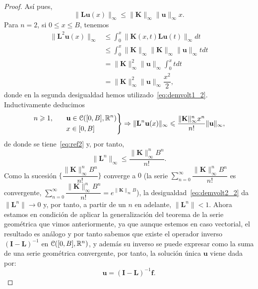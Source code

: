 \begin{proof}
	Así pues,
	\begin{equation}\label{eq:demvolt1_2}
		\lVert \textbf{L}\textbf{u}(x)\rVert_\infty \leqslant \lVert \textbf{K} \rVert_\infty \lVert \textbf{u} \rVert_\infty x.
	\end{equation}
	Para $n = 2$, si $0 \leqslant x \leqslant B$, tenemos
	\begin{equation}
		\begin{split}
			\lVert \textbf{L}^2\textbf{u}(x)\rVert_\infty & \leqslant \int_{0}^{x}\lVert \textbf{K}(x,t)\textbf{L}\textbf{u}(t)\rVert_\infty dt \\
			& \leqslant \int_{0}^{x} \lVert \textbf{K} \rVert_\infty \lVert \textbf{K} \rVert_\infty \lVert \textbf{u} \rVert_\infty tdt\\
			& =  \lVert \textbf{K} \rVert_\infty^2 \lVert \textbf{u} \rVert_\infty \int_{0}^{x}tdt \\
			& = \lVert \textbf{K} \rVert_\infty^2 \lVert \textbf{u} \rVert_\infty \dfrac{x^2}{2},
		\end{split}
	\end{equation}
	donde en la segunda desigualdad hemos utilizado~\eqref{eq:demvolt1_2}. Inductivamente deducimos
	\begin{equation}
		\left.\begin{split}
			n \geqslant 1, \qquad & \textbf{u} \in \mathcal{C}([0,B],\mathbb{R}^n)\\
			& x \in [0,B]
		\end{split}\right\rbrace \Rightarrow \lVert \textbf{L}^n\textbf{u}(x)\rVert_\infty \leqslant \dfrac{\lVert \textbf{K} \rVert_\infty^nx^n}{n!}\lVert \textbf{u} \rVert_\infty,
	\end{equation}
	de donde se tiene~\eqref{eq:ref2} y, por tanto,
	\begin{equation}\label{eq:demvolt2_2}
		\lVert \textbf{L}^n \rVert_\infty \leqslant \dfrac{\lVert \textbf{K} \rVert_\infty^nB^n}{n!}.
	\end{equation}
	Como la sucesión $\{\dfrac{\lVert \textbf{K} \rVert_\infty^nB^n}{n!}\}$ converge a $0$ (la serie $\displaystyle \sum_{n=0}^{\infty}\dfrac{\lVert \textbf{K} \rVert_\infty^nB^n}{n!}$ es convergente, $\displaystyle \sum_{n=0}^{\infty}\dfrac{\lVert \textbf{K} \rVert_\infty^nB^n}{n!} = e^{\lVert \textbf{K} \rVert_\infty B}$), la desigualdad~\eqref{eq:demvolt2_2} da $\lVert \textbf{L}^n \rVert \rightarrow 0$ y, por tanto, a partir de un $n$ en adelante, $\lVert \textbf{L}^n \rVert < 1$.
	Ahora estamos en condición de aplicar la generalización del teorema de la serie geométrica que vimos anteriormente, ya que aunque estemos en caso vectorial, el resultado es análogo y por tanto sabemos que existe el operador inverso $(\textbf{I}-\textbf{L})^{-1}$ en $\mathcal{C}([0,B],\mathbb{R}^n)$, y además su inverso se puede expresar como la suma de una serie geométrica convergente, por tanto, la solución única $\textbf{u}$ viene dada por:
	\begin{equation}
		\textbf{u} = (\textbf{I}-\textbf{L})^{-1}\textbf{f}.
	\end{equation}
\end{proof}
